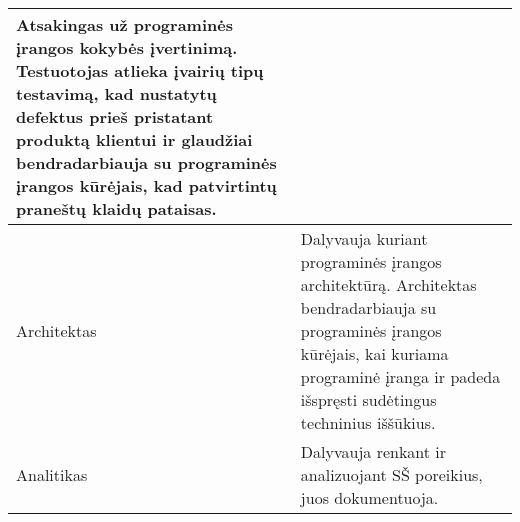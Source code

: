 \begin{table}[h!]
\begin{tabular}{p{}|p{}}
Atsakingas už programinės įrangos kokybės įvertinimą. Testuotojas atlieka įvairių tipų testavimą, kad nustatytų defektus prieš pristatant produktą klientui ir glaudžiai bendradarbiauja su programinės įrangos kūrėjais, kad patvirtintų praneštų klaidų pataisas.
\\ \hline

Architektas &


Dalyvauja kuriant programinės įrangos architektūrą. Architektas bendradarbiauja su programinės
įrangos kūrėjais, kai kuriama programinė įranga ir padeda išspręsti sudėtingus techninius iššūkius.
\\ \hline
Analitikas & 

Dalyvauja renkant ir analizuojant SŠ poreikius, juos dokumentuoja.
\\ \hline


\end{tabular}
\end{table}










